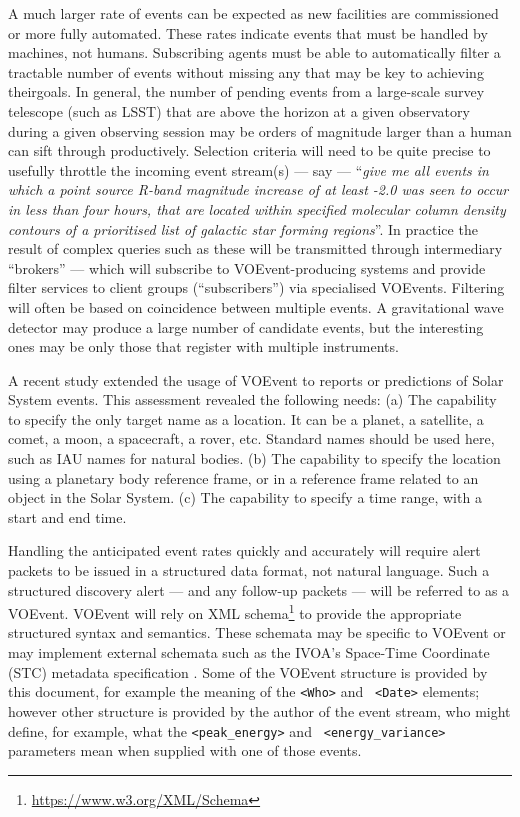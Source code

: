 \documentclass[11pt,a4paper]{ivoa}
\begin{document}
A much larger rate of events can be expected as new facilities are commissioned
or more fully automated. These rates indicate events that must be handled by
machines, not humans. Subscribing agents must be able to automatically filter a
tractable number of events without missing any that may be key to achieving 
theirgoals. In general, the number of pending events from a large-scale survey 
telescope (such as LSST) that are above the horizon at a given observatory 
during a given observing session may be orders of magnitude larger than a human 
can sift through productively. Selection criteria will need to be quite precise 
to usefully throttle the incoming event stream(s) --- say --- ``\emph{give me 
all events in which a point source R-band magnitude increase of at least -2.0 
was seen to occur in less than four hours, that are located within specified 
molecular column density contours of a prioritised list of galactic star forming
regions}''. In practice the result of complex queries such as these will be 
transmitted through intermediary ``brokers'' --- which will subscribe to 
VOEvent-producing systems and provide filter services to client groups 
(``subscribers'') via specialised VOEvents. Filtering will often be based on 
coincidence between multiple events. A gravitational wave detector may produce 
a large number of candidate events, but the interesting ones may be only those 
that register with multiple instruments.

A recent study \citep{2018arXiv181112680C} extended the usage of VOEvent to 
reports or predictions of Solar System events. This assessment revealed the 
following needs: (a) The capability to specify the only target name as a 
location. It can be a planet, a satellite, a comet, a moon, a spacecraft, a 
rover, etc. Standard names should be used here, such as IAU names for natural 
bodies. (b) The capability to specify the location using a planetary body 
reference frame, or in a reference frame related to an object in the Solar 
System. (c) The capability to specify a time range, with a start and end time.

Handling the anticipated event rates quickly and accurately will require alert 
packets to be issued in a structured data format, not natural language. Such a 
structured discovery alert --- and any follow-up packets --- will be referred 
to as a VOEvent. VOEvent will rely on XML schema\footnote{
\url{https://www.w3.org/XML/Schema}} to provide the appropriate structured 
syntax and semantics. These schemata may be specific to VOEvent or may implement
external schemata such as the IVOA's Space-Time Coordinate (STC) metadata 
specification \citep{2007ivoa.spec.1030R}. Some of the VOEvent structure is 
provided by this document, for example the meaning of the {\tt <Who>} and {\tt 
<Date>} elements; however other structure is provided by the author of the event
stream, who might define, for example, what the {\tt <peak\_energy>} and {\tt 
<energy\_variance>} parameters mean when supplied with one of those events. 
\end{document}
